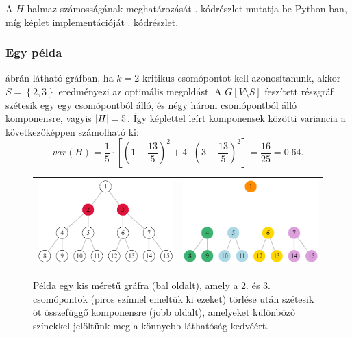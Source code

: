 A $H$ halmaz számosságának meghatározását . kódrészlet mutatja be Python-ban,
míg  képlet implementációját . kódrészlet.


\subsubsection{Egy példa}
 ábrán látható gráfban, ha $k = 2$ kritikus csomópontot kell azonosítanunk,
akkor $S = \left\{ 2, 3 \right\}$ eredményezi az optimális megoldást.
A $G\left[ V \setminus S \right]$ feszített részgráf szétesik egy egy csomópontból álló,
és négy három csomópontból álló komponensre, vagyis $\lvert H\rvert = 5$.
Így  képlettel leírt komponensek közötti variancia a következőképpen számolható ki:
\[
  var(H) = \dfrac{1}{5} \cdot \left[ \left( 1 - \dfrac{13}{5} \right)^{2} + 4 \cdot \left( 3 - \dfrac{13}{5} \right)^{2} \right] = \dfrac{16}{25} = 0.64.
\]


\begin{figure}[t]
  \centering
  \begin{tabular}{ll}
    \includegraphics[scale=0.4]{images/bocndp_before.png}
     &
    \includegraphics[scale=0.4]{images/bocndp_after.png}
  \end{tabular}
  \caption{
    Példa egy kis méretű gráfra (bal oldalt), amely a 2. és 3. csomópontok (piros színnel emeltük ki ezeket) törlése után
    szétesik öt összefüggő komponensre (jobb oldalt), amelyeket különböző színekkel jelöltünk meg a könnyebb láthatóság kedvéért.
  }
  \label{fig:BOCNDP_EXAMPLE}
\end{figure}



